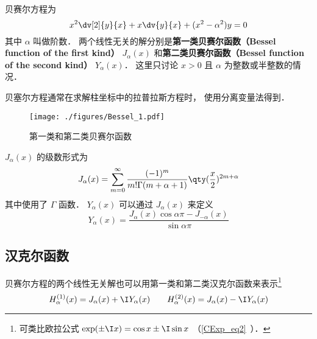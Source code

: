 
\begin{issues}
\issueMissDepend
\end{issues}

贝赛尔方程为%
\begin{equation}\label{Bessel_eq1}
x^2 \dv[2]{y}{x} + x\dv{y}{x} + (x^2 - \alpha ^2)y = 0
\end{equation}
其中 $\alpha$ 叫做阶数． 两个线性无关的解分别是\textbf{第一类贝赛尔函数（Bessel function of the first kind）} $J_\alpha(x)$ 和\textbf{第二类贝赛尔函数（Bessel function of the second kind）} $Y_\alpha(x)$． 这里只讨论 $x > 0$ 且 $\alpha$ 为整数或半整数的情况．

贝塞尔方程通常在求解柱坐标中的拉普拉斯方程时， 使用分离变量法得到．

\begin{figure}[ht]
\centering
\texttt{[image: ./figures/Bessel\_1.pdf]}
\caption{第一类和第二类贝赛尔函数} \label{Bessel_fig1}
\end{figure}

$J_\alpha(x)$ 的级数形式为
\begin{equation}
J_\alpha(x) = \sum_{m=0}^\infty \frac{(-1)^m}{m!\Gamma(m+\alpha+1)} \qty(\frac x2)^{2m+\alpha}
\end{equation}
其中使用了 $\Gamma$ 函数． $Y_\alpha(x)$ 可以通过 $J_\alpha(x)$ 来定义
\begin{equation}
Y_\alpha(x) = \frac{J_\alpha(x)\cos\alpha\pi - J_{-\alpha}(x)}{\sin\alpha\pi}
\end{equation}

\subsection{汉克尔函数}
贝赛尔方程的两个线性无关解也可以用第一类和第二类汉克尔函数来表示\footnote{可类比欧拉公式 $\exp(\pm\I x) = \cos x \pm \I\sin x$ （\autoref{CExp_eq2}~）．}
\begin{equation}
H_\alpha ^{(1)}(x) = J_\alpha(x) + \I Y_\alpha(x)
\qquad
H_\alpha ^{(2)}(x) = J_\alpha(x) - \I Y_\alpha(x)
\end{equation}


